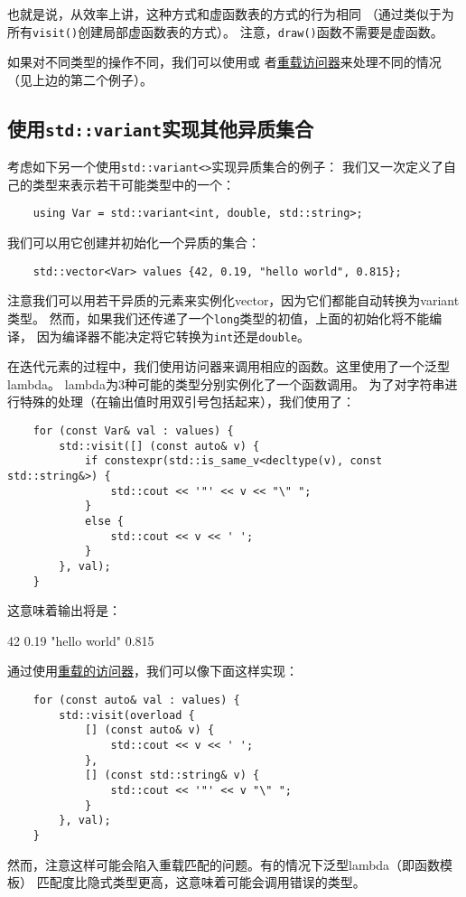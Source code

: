 也就是说，从效率上讲，这种方式和虚函数表的方式的行为相同
（通过类似于为所有\texttt{visit()}创建局部虚函数表的方式）。
注意，\texttt{draw()}函数不需要是虚函数。

如果对不同类型的操作不同，我们可以使用或
者\hyperref[ch16.3.3.4]{重载访问器}来处理不同的情况（见上边的第二个例子）。

\subsection{使用\texttt{std::variant}实现其他异质集合}
考虑如下另一个使用\texttt{std::variant<>}实现异质集合的例子：
我们又一次定义了自己的类型来表示若干可能类型中的一个：
\begin{lstlisting}
    using Var = std::variant<int, double, std::string>;
\end{lstlisting}
我们可以用它创建并初始化一个异质的集合：
\begin{lstlisting}
    std::vector<Var> values {42, 0.19, "hello world", 0.815};
\end{lstlisting}
注意我们可以用若干异质的元素来实例化vector，因为它们都能自动转换为variant类型。
然而，如果我们还传递了一个\texttt{long}类型的初值，上面的初始化将不能编译，
因为编译器不能决定将它转换为\texttt{int}还是\texttt{double}。

在迭代元素的过程中，我们使用访问器来调用相应的函数。这里使用了一个泛型lambda。
lambda为3种可能的类型分别实例化了一个函数调用。
为了对字符串进行特殊的处理（在输出值时用双引号包括起来），我们使用了：
\begin{lstlisting}
    for (const Var& val : values) {
        std::visit([] (const auto& v) {
            if constexpr(std::is_same_v<decltype(v), const std::string&>) {
                std::cout << '"' << v << "\" ";
            }
            else {
                std::cout << v << ' ';
            }
        }, val);
    }
\end{lstlisting}
这意味着输出将是：
\begin{blacklisting}
    42 0.19 "hello world" 0.815
\end{blacklisting}
通过使用\hyperref[ch16.3.3.4]{重载的访问器}，我们可以像下面这样实现：
\begin{lstlisting}
    for (const auto& val : values) {
        std::visit(overload {
            [] (const auto& v) {
                std::cout << v << ' ';
            },
            [] (const std::string& v) {
                std::cout << '"' << v "\" ";
            }
        }, val);
    }
\end{lstlisting}
然而，注意这样可能会陷入重载匹配的问题。有的情况下泛型lambda（即函数模板）
匹配度比隐式类型更高，这意味着可能会调用错误的类型。

